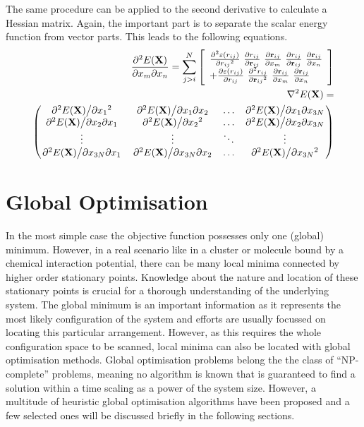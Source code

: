 The same procedure can be applied to the second derivative to calculate a
Hessian matrix. Again, the important part is to separate the scalar energy
function from vector parts. This leads to the following equations.
%
\begin{align}
    \pdv{E(\mathbf{X})}{x_m}{x_n}=\sum_{j>i}^N\left[  
    \begin{array}{ll}
    \pdv[2]{\varepsilon(r_{ij})}{{r_{ij}}}\  
    \pdv{r_{ij}}{\mathbf{r}_{ij}}\ 
    \pdv{\mathbf{r}_{ij}}{x_m}\ 
    \pdv{r_{ij}}{\mathbf{r}_{ij}}\ 
    \pdv{\mathbf{r}_{ij}}{x_n} \\ 
    +
    \pdv{\varepsilon(r_{ij})}{r_{ij}}\
        \pdv[2]{r_{ij}}{{\mathbf{r}_{ij}}}\ 
    \pdv{\mathbf{r}_{ij}}{x_m}\ 
    \pdv{\mathbf{r}_{ij}}{x_n} 
    \end{array}
    \right]\\
    \begin{aligned}
    \nabla^2 E(\mathbf{X})=\\
    \begin{pmatrix}
        \pdv*[2]{E(\mathbf{X})}{{x_1}} & \pdv*{E(\mathbf{X})}{x_1}{x_2} & \ldots & \pdv*{E(\mathbf{X})}{x_1}{x_{3N}}\\
        \pdv*{E(\mathbf{X})}{x_2}{x_1} & \pdv*[2]{E(\mathbf{X})}{{x_2}} & \ldots & \pdv*{E(\mathbf{X})}{x_2}{x_{3N}}\\
        \vdots & \vdots & \ddots & \vdots\\
        \pdv*{E(\mathbf{X})}{x_{3N}}{x_1} & \pdv*{E(\mathbf{X})}{x_{3N}}{x_2} & \ldots & \pdv*[2]{E(\mathbf{X})}{{x_{3N}}}
    \end{pmatrix}
    \end{aligned}
\end{align}

\section{Global Optimisation}
\label{sec:GlobalOptimisation}

In the most simple case the objective function possesses only one (global)
minimum. However, in a real scenario like in a cluster or molecule bound by a
chemical interaction potential, there can be many local minima connected by
higher order stationary points. Knowledge about the nature and location of these
stationary points is crucial for a thorough understanding of the underlying
system. The global minimum is an important information as it represents the most
likely configuration of the system and efforts are usually focussed on locating
this particular arrangement. However, as this requires the whole configuration
space to be scanned, local minima can also be located with global optimisation
methods. Global optimisation problems belong the the class of ``NP-complete''
problems, meaning no algorithm is known that is guaranteed to find a solution
within a time scaling as a power of the system size. However, a multitude of
heuristic global optimisation algorithms have been proposed and a few selected
ones will be discussed briefly in the following sections.


